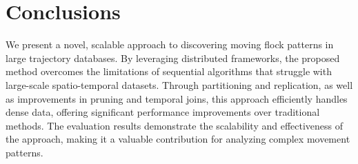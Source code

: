 \section{Conclusions} \label{sec:conclusions}
We present a novel, scalable approach to discovering moving flock patterns in large trajectory databases. By leveraging distributed frameworks, the proposed method overcomes the limitations of sequential algorithms that struggle with large-scale spatio-temporal datasets. Through partitioning and replication, as well as improvements in pruning and temporal joins, this approach efficiently handles dense data, offering significant performance improvements over traditional methods. The evaluation results demonstrate the scalability and effectiveness of the approach, making it a valuable contribution for analyzing complex movement patterns.